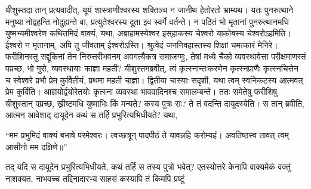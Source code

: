 \vakya यीशुस्तदा तान् प्रत्यवादीत्, यूयं शास्त्राणीश्वरस्य शक्तिञ्च न जानीथ हेतोरतो भ्राम्यथ।
\vakya यतः पुनरुत्थाने मनुष्या नोद्वहन्ति नोदुह्यन्ते वा, प्रत्युतेश्वरस्य दूता इव स्वर्गे वर्तन्ते।
\vakya न पठितं भो मृतानां पुनरुत्थानमधि युष्मभ्यमीश्वरेण कथितमिदं वाक्यं, यथा,
\vakya अब्राहामस्येश्वर इस्‌हाकस्य चेश्वरो याकोबस्य चेश्वरोऽहमिति। ईश्वरो न मृतानाम्, अपि तु जीवताम् ईश्वरोऽस्ति। श्रुत्वेदं जननिवहास्तस्य शिक्षां चमत्कारं मेनिरे।
\vakya फरीशिनस्तु सद्दूकिनां तेन निरुत्तरीभवनम् अवगत्यैकत्र समाजग्मुः,
\vakya तेषां मध्ये चैको व्यवस्थावेत्ता परीक्षमाणस्तं पप्रच्छ,
\vakya भो गुरो, व्यवस्थायाः काज्ञा महती?
\vakya यीशुस्तमब्रवीत्, त्वं कृत्स्नान्तःकरणेन कृत्स्नप्राणैः कृत्स्नचित्तेन च स्वेश्वरे प्रभौ प्रेम कुर्वितीयं,
\vakya प्रथमा महती चाज्ञा।
\vakya द्वितीया चास्याः सदृशी, यथा त्वम् स्वनिकटस्य आत्मवत् प्रेम कुर्विति।
\vakya आज्ञयोर्द्वयोरेतयोः कृत्स्ना व्यवस्था भाववादिनश्च समालम्बन्ते।
\vakya ततः समेतेषु फरीशिषु यीशुस्तान् पप्रच्छ, ख्रीष्टमधि युष्माभिः किं मन्यते? कस्य पुत्रः सः?
\vakya ते तं वदन्ति दायूदस्येति।
\vakya स तान् ब्रवीति, आत्मन आवेशाद् दायूदेन कथं स तर्हि प्रभुरित्यभिधीयते? यथा,
\begin{poem}
\startwithvakya “मम प्रभुमिदं वाक्यं बभाषे परमेश्वरः। 
\pline त्वच्छत्रून् पादपीठं ते यावन्नहि करोम्यहं।
\pline अवतिष्ठस्व तावत् त्वम् आसीनो मम दक्षिणे॥”
\end{poem}
\vakya तद् यदि स दायूदेन प्रभुरित्यभिधीयते, कथं तर्हि स तस्य पुत्रो भवेत्?
\vakya एतस्योत्तरे केनापि वाक्यमेकं वक्तुं नाशक्यत, नाभवच्च तद्दिनादारभ्य साहसं कस्यापि तं किमपि प्रष्टुं\eoc
